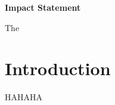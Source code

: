 \documentclass[lineno,authoryear]{FLO_v1}%
\theoremstyle{definition}
\begin{document}
\maketitle

\begin{boxtext}

\textbf{Impact Statement}

The

\end{boxtext}

\section{Introduction}

HAHAHA
\end{document}
